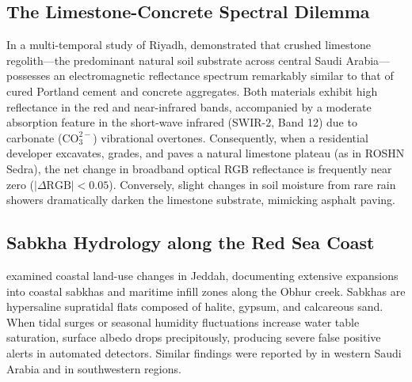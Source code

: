 \subsection{The Limestone-Concrete Spectral Dilemma}
In a multi-temporal study of Riyadh, \citet{alkharusi2024monitoring} demonstrated that crushed limestone regolith—the predominant natural soil substrate across central Saudi Arabia—possesses an electromagnetic reflectance spectrum remarkably similar to that of cured Portland cement and concrete aggregates. Both materials exhibit high reflectance in the red and near-infrared bands, accompanied by a moderate absorption feature in the short-wave infrared (SWIR-2, Band 12) due to carbonate ($\text{CO}_3^{2-}$) vibrational overtones. Consequently, when a residential developer excavates, grades, and paves a natural limestone plateau (as in ROSHN Sedra), the net change in broadband optical RGB reflectance is frequently near zero ($|\Delta \text{RGB}| < 0.05$). Conversely, slight changes in soil moisture from rare rain showers dramatically darken the limestone substrate, mimicking asphalt paving.

\subsection{Sabkha Hydrology along the Red Sea Coast}
\citet{hereher2020assessment} examined coastal land-use changes in Jeddah, documenting extensive expansions into coastal sabkhas and maritime infill zones along the Obhur creek. Sabkhas are hypersaline supratidal flats composed of halite, gypsum, and calcareous sand. When tidal surges or seasonal humidity fluctuations increase water table saturation, surface albedo drops precipitously, producing severe false positive alerts in automated detectors. Similar findings were reported by \citet{alqurashi2014land} in western Saudi Arabia and \citet{mallick2021evaluating} in southwestern regions.

